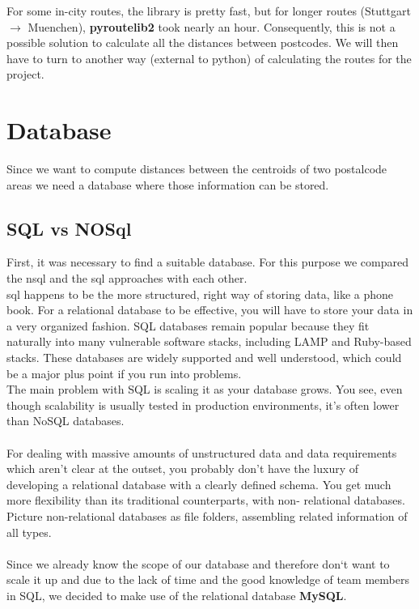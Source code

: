 \documentclass[12pt]{article}
\begin{document}
\noindent For some in-city routes, the library is pretty fast, but for longer routes (Stuttgart $\rightarrow$ Muenchen), \textbf{pyroutelib2} took nearly an hour. Consequently, this is not a possible solution to calculate all the distances between postcodes. We will then have to turn to another way (external to python) of calculating the routes for the project.
\section{Database}
Since we want to compute distances between the centroids of two postalcode areas we need a database where those information can be stored. 
\subsection{SQL vs NOSql}
First, it was necessary to find a suitable database. For this purpose we compared the \ac{nsql} and the \ac{sql} approaches with each other.\\
\acs{sql} happens to be the more structured, right way of storing data, like a phone book. For a relational database to be effective, you will have to store your data in a
very organized fashion. SQL databases remain popular because they fit naturally into many
vulnerable software stacks, including LAMP and Ruby-based stacks. These databases are widely
supported and well understood, which could be a major plus point if you run into problems.\\
The main problem with SQL is scaling it as your database grows. You see, even though
scalability is usually tested in production environments, it’s often lower than NoSQL
databases.\\\\
For dealing with massive amounts of unstructured data and data requirements which
aren’t clear at the outset, you probably don’t have the luxury of developing a relational database with
a clearly defined schema. You get much more flexibility than its traditional counterparts, with non-
relational databases. Picture non-relational databases as file folders, assembling related information
of all types.\\\\
Since we already know the scope of our database and therefore don`t want to scale it up and due to the lack of time and the good knowledge of team members in SQL, we decided to make use of the relational database \textbf{MySQL}.
\end{document}
